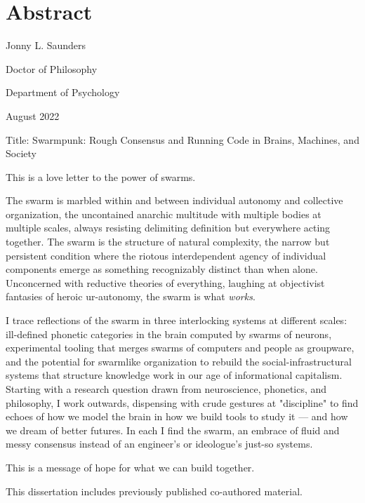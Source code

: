\chapter*{Abstract}

Jonny L. Saunders

\noindent Doctor of Philosophy

\noindent Department of Psychology

\noindent August 2022

\noindent Title: Swarmpunk: Rough Consensus and Running Code in Brains, Machines, and Society

This is a love letter to the power of swarms.

The swarm is marbled within and between individual autonomy and collective organization, the uncontained anarchic multitude with multiple bodies at multiple scales, always resisting delimiting definition but everywhere acting together. The swarm is the structure of natural complexity, the narrow but persistent condition where the riotous interdependent agency of individual components emerge as something recognizably distinct than when alone. Unconcerned with reductive theories of everything, laughing at objectivist fantasies of heroic ur-autonomy, the swarm is what \textit{works}.

I trace reflections of the swarm in three interlocking systems at different scales: ill-defined phonetic categories in the brain computed by swarms of neurons, experimental tooling that merges swarms of computers and people as groupware, and the potential for swarmlike organization to rebuild the social-infrastructural systems that structure knowledge work in our age of informational capitalism. Starting with a research question drawn from neuroscience, phonetics, and philosophy, I work outwards, dispensing with crude gestures at "discipline" to find echoes of how we model the brain in how we build tools to study it --- and how we dream of better futures. In each I find the swarm, an embrace of fluid and messy consensus instead of an engineer's or ideologue's just-so systems. 

This is a message of hope for what we can build together.

This dissertation includes previously published co-authored material.